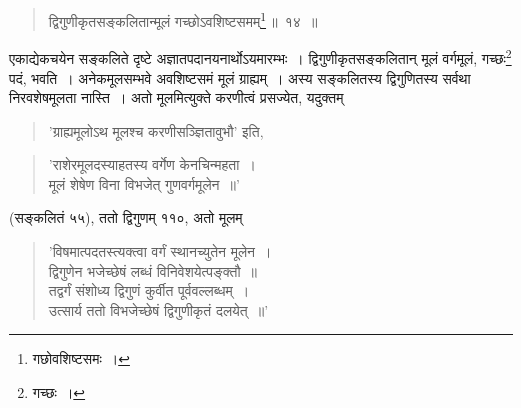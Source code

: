 \documentclass[10pt, openany]{book}
\begin{document}
{\newpage

 \label{14}
\begin{quote}
{\bs द्विगुणीकृतसङ्कलितान्मूलं गच्छोऽवशिष्टसमम्\renewcommand{\thefootnote}{\s १}\footnote{\s गछोवशिष्टसमः~।}\,॥~१४~॥}\end{quote}

{एकाद्येकचयेन सङ्कलिते दृष्टे अज्ञातपदानयनार्थोऽयमारम्भः~।
द्विगुणीकृतसङ्कलितान्} 
{मूलं वर्गमूलं, गच्छः\renewcommand{\thefootnote}{\s २}\footnote{\s गच्छः~।} पदं, भवति~। अनेकमूलसम्भवे अवशिष्टसमं मूलं
ग्राह्यम्~। अस्य}
{सङ्कलितस्य द्विगुणितस्य सर्वथा निरवशेषमूलता नास्ति~। अतो मूलमित्युक्ते
करणीत्वं प्रसज्येत, यदुक्तम्\textemdash}

\begin{quote}
{\qt 'ग्राह्यमूलोऽथ मूलश्च करणीसञ्ज्ञितावुभौ'} इति,
\end{quote}


\begin{quote}
    
{\qt 'राशेरमूलदस्याहतस्य वर्गेण केनचिन्महता~। \\
 मूलं शेषेण विना विभजेत् गुणवर्गमूलेन~॥'}\end{quote}


{(सङ्कलितं ५५), ततो द्विगुणम् ११०, अतो मूलम्\textemdash}

\begin{quote}{\qt 'विषमात्पदतस्त्यक्त्वा वर्गं स्थानच्युतेन मूलेन~। \\
 द्विगुणेन भजेच्छेषं लब्धं विनिवेशयेत्पङ्क्तौ~॥ \\
 तद्वर्गं संशोध्य द्विगुणं कुर्वीत पूर्ववल्लब्धम्~। \\
 उत्सार्य ततो विभजेच्छेषं द्विगुणीकृतं दलयेत्~॥'}\end{quote}

}
\end{document}
